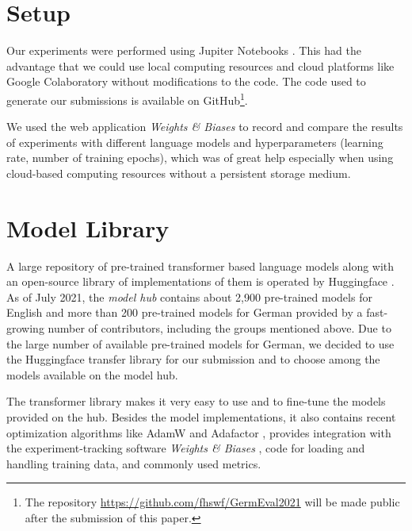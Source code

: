\documentclass[11pt,a4paper]{article}
\begin{document}
\section{Setup}
Our experiments were performed using Jupiter Notebooks \cite{Kluyver2016jupyter}.
This had the advantage that we could use local computing resources and cloud platforms 
like Google Colaboratory \cite{Bisong2019} without modifications to the code.
The code used to generate our submissions is available on 
GitHub\footnote{The repository \url{https://github.com/fhswf/GermEval2021} will be made public after the 
submission of this paper.}.

We used the web application \emph{Weights \& Biases} \cite{wandb} to record and compare the results of experiments with 
different language models and hyperparameters (learning rate, number of training epochs), which was of great help especially 
when using cloud-based computing resources without a persistent storage medium.

\section{Model Library}
A large repository of pre-trained transformer based language models along with an open-source library of implementations 
of them is operated by Huggingface \cite{huggingface}.
As of July 2021, the \emph{model hub} contains about 2,900 pre-trained models for English and more than 200 pre-trained 
models for German provided by a fast-growing number of contributors, including the groups mentioned above.
Due to the large number of available pre-trained models for German, we decided to use the Huggingface transfer library 
for our submission and to choose among the models available on the model hub.

The transformer library makes it very easy to use and to fine-tune the models provided on the hub. 
Besides the model implementations, it also contains recent optimization algorithms like AdamW \cite{AdamW} and 
Adafactor \cite{Adafactor}, provides integration with the experiment-tracking software \emph{Weights \& Biases} \cite{wandb},
code for loading and handling training data, and commonly used metrics.
\end{document}
